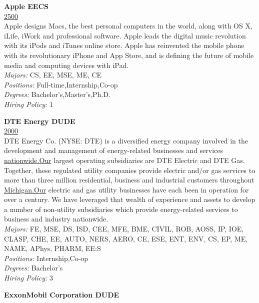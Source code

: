 \documentclass[twoside]{article}
\begin{document}
    \begin{center}\begin{multicols}{2}
    \begin{minipage}{.95\columnwidth}{\Large\bf Apple \hfill EECS}\\
    \url{2500}\\
    Apple designs Macs, the best personal computers in the world, along with OS X, iLife, iWork and professional software. Apple leads the digital music revolution with its iPods and iTunes online store. Apple has reinvented the mobile phone with its revolutionary iPhone and App Store, and is defining the future of mobile media and computing devices with iPad.\\
    \emph{Majors:} CS, EE, MSE, ME, CE\\
    \emph{Positions:} Full-time,Internship,Co-op\\
    \emph{Degrees:} Bachelor's,Master's,Ph.D.\\
    \emph{Hiring Policy:} 1\\
\end{minipage}
 \begin{minipage}{.95\columnwidth}{\Large\bf DTE Energy \hfill DUDE}\\
    \url{2000}\\
    DTE Energy Co. (NYSE: DTE) is a diversified energy company involved in the development and management of energy-related businesses and services \url{nationwide.Our} largest operating subsidiaries are DTE Electric and DTE Gas. Together, these regulated utility companies provide electric and/or gas services to more than three million residential, business and industrial customers throughout \url{Michigan.Our} electric and gas utility businesses have each been in operation for over a century. We have leveraged that wealth of experience and assets to develop a number of non-utility subsidiaries which provide energy-related services to business and industry nationwide.\\
    \emph{Majors:} FE, MSE, DS, ISD, CEE, MFE, BME, CIVIL, ROB, AOSS, IP, IOE, CLASP, CHE, EE, AUTO, NERS, AERO, CE, ESE, ENT, ENV, CS, EP, ME, NAME, APhys, PHARM, EE:S\\
    \emph{Positions:} Internship,Co-op\\
    \emph{Degrees:} Bachelor's\\
    \emph{Hiring Policy:} 3\\
\end{minipage}
 \begin{minipage}{.95\columnwidth}{\Large\bf ExxonMobil Corporation \hfill DUDE}\\

\end{minipage}
\end{multicols}
\end{center}
\end{document}

